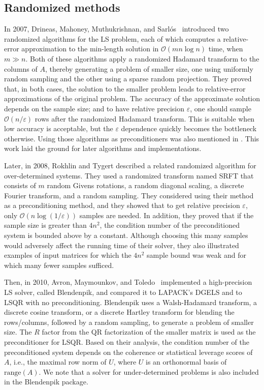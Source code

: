 \documentclass{siamltex}
\begin{document}
\subsection{Randomized methods}




In 2007, Drineas, Mahoney, Muthukrishnan, and
Sarl{\'o}s~\cite{drineas2007faster} introduced two randomized algorithms for the
LS problem, each of which computes a relative-error approximation to the
min-length solution in $\mathcal{O}(m n \log n)$ time, when $m \gg n$.  Both of
these algorithms apply a randomized Hadamard transform to the columns of $A$,
thereby generating a problem of smaller size, one using uniformly random
sampling and the other using a sparse random projection.  They proved that, in
both cases, the solution to the smaller problem leads to relative-error
approximations of the original problem.  The accuracy of the approximate
solution depends on the sample size; and to have relative precision
$\varepsilon$, one should sample $\mathcal{O}(n/\varepsilon)$ rows after the
randomized Hadamard transform.  This is suitable when low accuracy is
acceptable, but the $\varepsilon$ dependence quickly becomes the bottleneck
otherwise.  Using those algorithms as preconditioners was also mentioned in
\cite{drineas2007faster}. This work laid the ground for later algorithms and
implementations.



Later, in 2008, Rokhlin and Tygert \cite{rokhlin2008fast} described a related
randomized algorithm for over-determined systems.  They used a randomized
transform named SRFT that consists of $m$ random Givens rotations, a random
diagonal scaling, a discrete Fourier transform, and a random sampling.  They
considered using their method as a preconditioning method, and they showed that
to get relative precision $\varepsilon$, only $\mathcal{O}(n \log (1 /
\varepsilon))$ samples are needed.  In addition, they proved that if the sample
size is greater than $4 n^2$, the condition number of the preconditioned system
is bounded above by a constant.  Although choosing this many samples would
adversely affect the running time of their solver, they also illustrated
examples of input matrices for which the $4 n^2$ sample bound was weak and for
which many fewer samples sufficed.



Then, in 2010, Avron, Maymounkov, and Toledo~\cite{avron2010blendenpik}
implemented a high-precision LS solver, called Blendenpik, and compared it to
LAPACK's DGELS and to LSQR with no preconditioning.  Blendenpik uses a
Walsh-Hadamard transform, a discrete cosine transform, or a discrete Hartley
transform for blending the rows/columns, followed by a random sampling, to
generate a problem of smaller size.  The $R$ factor from the QR factorization of
the smaller matrix is used as the preconditioner for LSQR.  Based on their
analysis, the condition number of the preconditioned system depends on the
coherence or statistical leverage scores of $A$, i.e., the maximal row norm of
$U$, where $U$ is an orthonormal basis of $\text{range}(A)$.  We note that a
solver for under-determined problems is also included in the Blendenpik package.
\end{document}
